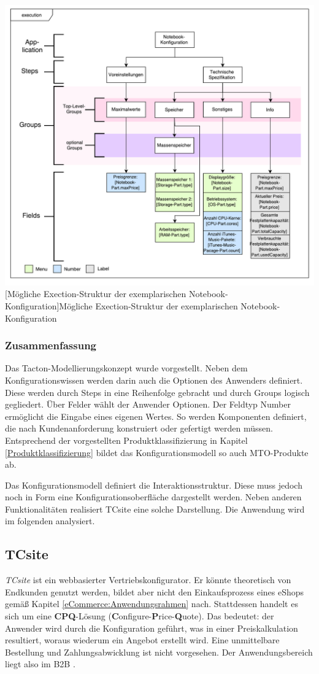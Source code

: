 \documentclass[11pt, a4paper, titlepage, listof=totoc, bibliography=totoc, index=totoc, twoside, openright, headings=normal]{scrreprt}
\begin{document}
\begin{minipage}{\linewidth}
	\centering
	\includegraphics[width=0.8\linewidth]{Abbildungen/tactonModellExecutionNotebook.pdf}
	[Mögliche Exection-Struktur der exemplarischen Notebook-Konfiguration]{Mögliche Exection-Struktur der exemplarischen Notebook-Konfiguration}
	\label{fig:tactonModellExecutionNotebook}
\end{minipage}
\vspace{0.3em}

\subsubsection*{Zusammenfassung}
Das Tacton-Modellierungskonzept wurde vorgestellt. Neben dem Konfigurationswissen werden darin auch die Optionen des Anwenders definiert. Diese werden durch Steps in eine Reihenfolge gebracht und durch Groups logisch gegliedert. Über Felder wählt der Anwender Optionen. Der Feldtyp Number ermöglicht die Eingabe eines eigenen Wertes. So werden Komponenten definiert, die nach Kundenanforderung konstruiert oder gefertigt werden müssen. Entsprechend der vorgestellten Produktklassifizierung in Kapitel \ref{Produktklassifizierung} bildet das Konfigurationsmodell so auch \ac{MTO}-Produkte ab.

Das Konfigurationsmodell definiert die Interaktionsstruktur. Diese muss jedoch noch in Form eine Konfigurationsoberfläche dargestellt werden. Neben anderen Funktionalitäten realisiert TCsite eine solche Darstellung. Die Anwendung wird im folgenden analysiert.

\subsection{TCsite}
\label{TCsite}
\emph{TCsite} ist ein webbasierter Vertriebskonfigurator. Er könnte theoretisch von Endkunden genutzt werden, bildet aber nicht den Einkaufsprozess eines eShops gemäß Kapitel \ref{eCommerce:Anwendungsrahmen} nach. Stattdessen handelt es sich um eine \textbf{CPQ}-Lösung (\textbf{C}onfigure-\textbf{P}rice-\textbf{Q}uote). Das bedeutet: der Anwender wird durch die Konfiguration geführt, was in einer Preiskalkulation resultiert, woraus wiederum ein Angebot erstellt wird. Eine unmittelbare Bestellung und Zahlungsabwicklung ist nicht vorgesehen. Der Anwendungsbereich liegt also im B2B \citep{tactonAbout}.
\end{document}
